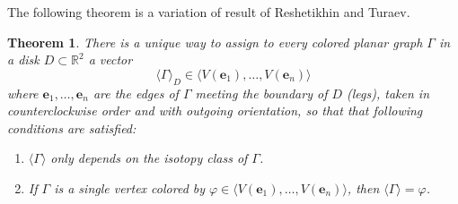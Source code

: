 \documentclass{amsart}
\newtheorem{theorem}{Theorem}[section]
\theoremstyle{definition}
\theoremstyle{remark}
\numberwithin{equation}{section}
\newcommand{\<}{\langle}
\renewcommand{\>}{\rangle}
\newcommand{\R}{\mathbb{R}}       %
\newcommand{\ee}{\mathbf{e}}       %
\newcommand{\Ga}{\Gamma}
\newcommand{\ph}{\varphi}
\begin{document}
The following theorem is a variation of result of Reshetikhin and Turaev. 
\begin{theorem}\label{t:RT}
  There is a unique  way to assign to every colored
  planar graph $\Ga$ in a disk $D\subset \R^2$ a vector
  \begin{equation}
    \<\Ga\>_D\in\<V(\ee_1),\dots, V(\ee_n)\>
  \end{equation}
  where $\ee_1,\dots, \ee_n$ are the edges of $\Ga$ meeting the boundary
  of $D$ (legs), taken in counterclockwise order and with outgoing orientation,
  so that that following conditions are satisfied:
  \begin{enumerate}
     \item $\<\Ga\>$ only depends on the isotopy  class of $\Ga$.

    \item If $\Ga$ is a single vertex colored by
          $\ph\in \<V(\ee_1),\dots, V(\ee_n)\>$, then $\<\Ga\>=\ph$.
     

\end{enumerate}
\end{theorem}
\end{document}
